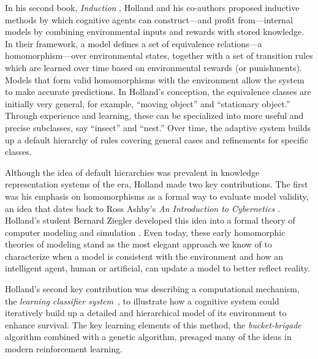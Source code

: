\documentclass{sig-alternate}
\begin{document}
In his second book, \emph{Induction} \cite{Holland1989}, Holland and
his co-authors proposed inductive methods by which cognitive agents
can construct---and profit from---internal models by combining
environmental inputs and rewards with stored knowledge.  In their
framework, a model defines a set of equivalence relations---a
homomorphism---over environmental states, together with a set of
transition rules which are learned over time based on environmental
rewards (or punishments).  Models that form valid homomorphisms with
the environment allow the system to make accurate predictions.  In
Holland's conception, the equivalence classes are initially very
general, for example, ``moving object'' and ``stationary object.''
Through experience and learning, these can be specialized into more
useful and precise subclasses, say ``insect'' and ``nest.''  Over
time, the adaptive system builds up a default hierarchy of rules
covering general cases and refinements for specific classes.

Although the idea of default hierarchies was prevalent in knowledge
representation systems of the era, Holland made two key contributions.
The first was his emphasis on homomorphisms as a formal way to
evaluate model validity, an idea that dates back to Ross Ashby's
\emph{An Introduction to Cybernetics} \cite{Ashby1956}. Holland's
student Bernard Ziegler developed this idea into a formal theory of
computer modeling and simulation \cite{Ziegler1976}.  Even today,
these early homomorphic theories of modeling stand as the most elegant
approach we know of to characterize when a model is consistent with
the environment and how an intelligent agent, human or artificial, can
update a model to better reflect reality.

Holland's second key contribution was describing a computational
mechanism, the \emph{learning classifier
  system}~\cite{Holland1986,Holland1977}, to illustrate how a cognitive system could
iteratively build up a detailed and hierarchical model of its
environment to enhance survival.  The key learning elements of this method, the
\emph{bucket-brigade} algorithm combined with a genetic algorithm, presaged many of the ideas in modern reinforcement
learning. 

\end{document}
